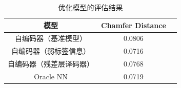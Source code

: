 \documentclass[bachelor, nocolorlinks, printoneside]{seuthesis} %
\begin{document}
\begin{Main}
\begin{table}
    \centering
    \caption{优化模型的评估结果}
    \begin{tabular}{ccc} 
    \hline
    模型                      & Chamfer Distance \\
    \hline
    自编码器（基准模型）            & 0.0806     \\
    自编码器（弱标签信息）           & 0.0716                             \\
    自编码器（残差层译码器）         & 0.0768                         \\
    Oracle NN & 0.0719                           \\
    \hline
    \end{tabular}
    \label{table:metric_optimal_baseline}
\end{table}


\end{Main}
\end{document}
